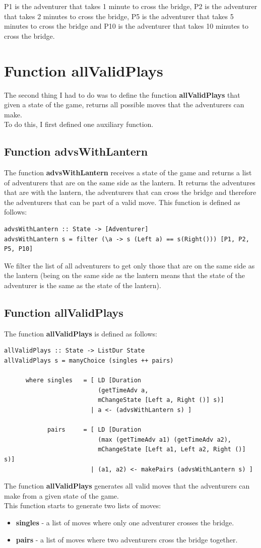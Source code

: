 \documentclass[a4paper,12pt]{report}
\begin{document}
P1 is the adventurer that takes 1 minute to cross the bridge, P2 is the adventurer that takes 2 minutes to cross the bridge, P5 is the adventurer that takes 5 minutes to cross the bridge and P10 is the adventurer that takes 10 minutes to cross the bridge.

\section{Function allValidPlays}
The second thing I had to do was to define the function \textbf{allValidPlays} that given a state of the game, returns all possible moves that the adventurers can make.
\\[1em]
To do this, I first defined one auxiliary function.
\subsection{Function advsWithLantern}
The function \textbf{advsWithLantern} receives a state of the game and returns a list of adventurers that are on the same side as the lantern.
It returns the adventures that are with the lantern,
the adventurers that can cross the bridge and therefore the adventurers that can be part of a valid move.
This function is defined as follows:
\begin{verbatim}
advsWithLantern :: State -> [Adventurer]
advsWithLantern s = filter (\a -> s (Left a) == s(Right())) [P1, P2, P5, P10]
\end{verbatim}
We filter the list of all adventurers to get only those that are on the same side as the lantern
(being on the same side as the lantern means that the state of the adventurer is the same as the state of the lantern).
\subsection{Function allValidPlays}
The function \textbf{allValidPlays} is defined as follows:
\begin{verbatim}
allValidPlays :: State -> ListDur State
allValidPlays s = manyChoice (singles ++ pairs)

      where singles   = [ LD [Duration 
                          (getTimeAdv a,
                          mChangeState [Left a, Right ()] s)]
                        | a <- (advsWithLantern s) ]

            pairs     = [ LD [Duration 
                          (max (getTimeAdv a1) (getTimeAdv a2),
                          mChangeState [Left a1, Left a2, Right ()] s)]
                        | (a1, a2) <- makePairs (advsWithLantern s) ]
\end{verbatim}
The function \textbf{allValidPlays} generates all valid moves that the adventurers can make from a given state of the game.
\\[1em]
This function starts to generate two lists of moves:
\begin{itemize}
\item \textbf{singles} - a list of moves where only one adventurer crosses the bridge.
\item \textbf{pairs} - a list of moves where two adventurers cross the bridge together.
\end{itemize}
\end{document}
